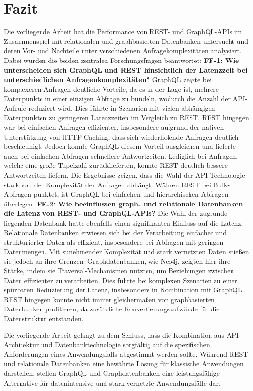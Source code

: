 \chapter{Fazit} %
\label{sec:fazit}
Die vorliegende Arbeit hat die Performance von REST- und GraphQL-APIs im Zusammenspiel mit relationalen und graphbasierten Datenbanken untersucht und deren Vor- und Nachteile unter verschiedenen Anfragekomplexitäten analysiert. Dabei wurden die beiden zentralen Forschungsfragen beantwortet:
\newline
\noindent
\textbf{FF-1: Wie unterscheiden sich GraphQL und REST hinsichtlich der Latenzzeit bei unterschiedlichen Anfragenkomplexitäten?}
GraphQL zeigte bei komplexeren Anfragen deutliche Vorteile, da es in der Lage ist, mehrere Datenpunkte in einer einzigen Abfrage zu bündeln, wodurch die Anzahl der API-Aufrufe reduziert wird. Dies führte in Szenarien mit vielen abhängigen Datenpunkten zu geringeren Latenzzeiten im Vergleich zu REST. REST hingegen war bei einfachen Anfragen effizienter, insbesondere aufgrund der nativen Unterstützung von HTTP-Caching, dass sich wiederholende Anfragen deutlich beschleunigt. Jedoch konnte GraphQL diesem Vorteil ausgleichen und lieferte auch bei einfachen Abfragen schnellere Antwortzeiten. Lediglich bei Anfragen, welche eine große Tupelzahl zurücklieferten, konnte REST deutlich bessere Antwortzeiten liefern. Die Ergebnisse zeigen, dass die Wahl der API-Technologie stark von der Komplexität der Anfragen abhängt: Währen REST bei Bulk-Abfragen punktet, ist GraphQL bei einfachen und hierarchischen Abfragen überlegen.
\newline
\noindent
\textbf{FF-2: Wie beeinflussen graph- und relationale Datenbanken die Latenz von REST- und GraphQL-APIs?}
Die Wahl der zugrunde liegenden Datenbank hatte ebenfalls einen signifikanten Einfluss auf die Latenz. Relationale Datenbanken erwiesen sich bei der Verarbeitung einfacher und strukturierter Daten als effizient, insbesondere bei Abfragen mit geringen Datenmengen. Mit zunehmender Komplexität und stark vernetzten Daten stießen sie jedoch an ihre Grenzen. Graphdatenbanken, wie Neo4j, zeigten hier ihre Stärke, indem sie Traversal-Mechanismen nutzten, um Beziehungen zwischen Daten effizienter zu verarbeiten. Dies führte bei komplexen Szenarien zu einer spürbaren Reduzierung der Latenz, insbesondere in Kombination mit GraphQL. REST hingegen konnte nicht immer gleichermaßen von graphbasierten Datenbanken profitieren, da zusätzliche Konvertierungsaufwände für die Datenstruktur entstanden.

\vspace{1em} 
\noindent
Die vorliegende Arbeit gelangt zu dem Schluss, dass die Kombination aus API-Architektur und Datenbanktechnologie sorgfältig auf die spezifischen Anforderungen eines Anwendungsfalls abgestimmt werden sollte. Während REST und relationale Datenbanken eine bewährte Lösung für klassische Anwendungen darstellen, stellen GraphQL und Graphdatenbanken eine leistungsfähige Alternative für datenintensive und stark vernetzte Anwendungsfälle dar.





